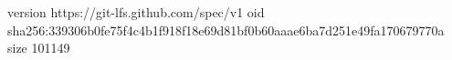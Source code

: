 version https://git-lfs.github.com/spec/v1
oid sha256:339306b0fe75f4c4b1f918f18e69d81bf0b60aaae6ba7d251e49fa170679770a
size 101149
